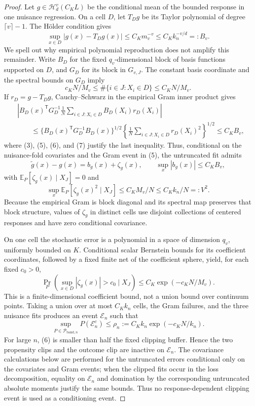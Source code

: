 \documentclass{article}
\begin{document}
\begin{proof}
Let \(g\in\mathcal H_d^v(C_KL)\) be the conditional mean of the bounded response in one nuisance regression.  On a cell \(D\), let \(T_Dg\) be its Taylor polynomial of degree \(\lceil v\rceil-1\).  The H\"older condition gives
\[
\sup_{x\in D}|g(x)-T_Dg(x)|\le C_Km_v^{-v}\le C_Kk_n^{-v/d}=:B_v.
\tag{6}
\]
We spell out why empirical polynomial reproduction does not amplify this remainder.  Write \(B_D\) for the fixed \(q_v\)-dimensional block of basis functions supported on \(D\), and \(G_D\) for its block in \(G_{v,J}\).  The constant basis coordinate and the spectral bounds on \(G_D\) imply
\[
c_KN/M_v\le \#\{i\in J:X_i\in D\}\le C_KN/M_v.
\tag{7}
\]
If \(r_D=g-T_Dg\), Cauchy--Schwarz in the empirical Gram inner product gives
\[
\begin{aligned}
&\left|B_D(x)^{\mathsf T}G_D^{-1}
\frac1N\sum_{i\in J:X_i\in D}B_D(X_i)r_D(X_i)\right|\\
&\qquad\le
\{B_D(x)^{\mathsf T}G_D^{-1}B_D(x)\}^{1/2}
\left\{\frac1N\sum_{i\in J:X_i\in D}r_D(X_i)^2\right\}^{1/2}
\le C_KB_v,
\end{aligned}
\tag{8}
\]
where (3), (5), (6), and (7) justify the last inequality.  Thus, conditional on the nuisance-fold covariates and the Gram event in (5), the untruncated fit admits
\[
\widetilde g(x)-g(x)=b_g(x)+\zeta_g(x),
\qquad
\sup_x|b_g(x)|\le C_KB_v,
\tag{9}
\]
with \(\mathbb E_P[\zeta_g(x)\mid X_J]=0\) and
\[
\sup_x\mathbb E_P[\zeta_g(x)^2\mid X_J]
\le C_KM_v/N\le C_Kk_n/N=:V^2.
\tag{10}
\]
Because the empirical Gram is block diagonal and its spectral map preserves that block structure, values of \(\zeta_g\) in distinct cells use disjoint collections of centered responses and have zero conditional covariance.

On one cell the stochastic error is a polynomial in a space of dimension \(q_v\), uniformly bounded on \(K\).  Conditional scalar Bernstein bounds for its coefficient coordinates, followed by a fixed finite net of the coefficient sphere, yield, for each fixed \(c_0>0\),
\[
\Pr_P\!\left(\sup_{x\in D}|\zeta_g(x)|>c_0\mid X_J\right)
\le C_K\exp(-c_KN/M_v).
\tag{11}
\]
This is a finite-dimensional coefficient bound, not a union bound over continuum points.  Taking a union over at most \(C_Kk_n\) cells, the Gram failures, and the three nuisance fits produces an event \(\mathcal E_n\) such that
\[
\sup_{P\in\mathcal P_{\mathrm{band},n}}P(\mathcal E_n^c)
\le \rho_n:=C_Kk_n\exp(-c_KN/k_n).
\tag{12}
\]
For large \(n\), (6) is smaller than half the fixed clipping buffer.  Hence the two propensity clips and the outcome clip are inactive on \(\mathcal E_n\).  The covariance calculations below are performed for the untruncated errors conditional only on the covariates and Gram events; when the clipped fits occur in the loss decomposition, equality on \(\mathcal E_n\) and domination by the corresponding untruncated absolute moments justify the same bounds.  Thus no response-dependent clipping event is used as a conditioning event.


\end{proof}
\end{document}
